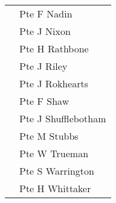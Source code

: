 \begin{center}
\begin{tabular}{rl}
    & Pte F Nadin \\
    & Pte J Nixon \\
    & Pte H Rathbone \\
    & Pte J Riley \\
    & Pte J Rokhearts \\
    & Pte F Shaw \\
    & Pte J Shufflebotham \\
    & Pte M Stubbs \\
    & Pte W Trueman \\
    & Pte S Warrington \\
    & Pte H Whittaker \\
  \end{tabular}
\end{center}
